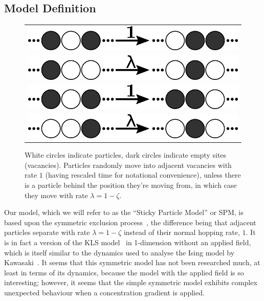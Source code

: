 \subsection{Model Definition}
\begin{figure}
\vspace{1em}
\caption{\label{fig:rates} White circles indicate particles, dark circles indicate empty sites (vacancies). Particles randomly move into adjacent vacancies with rate $1$ (having rescaled time for notational convenience), unless there is a
particle behind the position they're moving from, in which case they move with rate $\lambda=1-\zeta$.}
 \begin{tabular}{c}
    \includegraphics[width=\linewidth]{../tex-src/images/rateDiags/freeLeft} \\
    \includegraphics[width=\linewidth]{../tex-src/images/rateDiags/stickLeft} \\
    \includegraphics[width=\linewidth]{../tex-src/images/rateDiags/freeRight} \\
    \includegraphics[width=\linewidth]{../tex-src/images/rateDiags/stickRight} \\
    \end{tabular}
    \vspace{-1em}
\end{figure}
Our model, which we will refer to as the ``Sticky Particle Model'' or SPM, is based upon the symmetric exclusion process~\cite{sugden2007dynamically}, the difference being that adjacent particles separate with rate $\lambda=1-\zeta$
instead of their normal hopping rate, $1$. It is in fact a version of the KLS model~\cite{Katz1984, Zia2010} in 1-dimension without an applied field, which is itself similar to the dynamics used to analyse the Ising model by
Kawasaki~\cite{PhysRev.145.224}. It seems that this symmetric model has not been researched much, at least in terms of its dynamics, because the model with the applied field is so interesting; however, it seems that the simple symmetric model
exhibits complex unexpected behaviour when a concentration gradient is applied.


